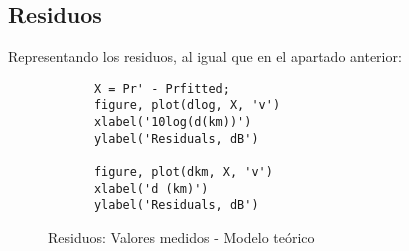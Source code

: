 \documentclass{article}
\begin{document}
    \subsection{Residuos}
        \par Representando los residuos, al igual que en el apartado anterior:
        \begin{lstlisting}
            X = Pr' - Prfitted;
            figure, plot(dlog, X, 'v')
            xlabel('10log(d(km))')
            ylabel('Residuals, dB')
            
            figure, plot(dkm, X, 'v') 
            xlabel('d (km)')
            ylabel('Residuals, dB')
        \end{lstlisting}
        \begin{figure}[h]
        \centering
         \begin{subfigure}
                 \texttt{[image: figures\_outputs/B3/residuos\_2.eps]}
         \end{subfigure}
         \begin{subfigure}
                \texttt{[image: figures\_outputs/B3/resuidos\_un\_2.eps]} 
         \end{subfigure}
        \caption{Residuos: Valores medidos - Modelo teórico}
        \label{fig:my_label}
    \end{figure}
\end{document}
